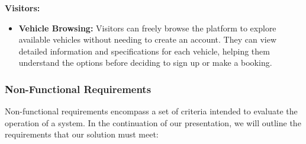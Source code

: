 \noindent\textbf{Visitors:}
\begin{itemize}
    \item \textbf{Vehicle Browsing:} Visitors can freely browse the platform to explore available vehicles without needing to create an account. They can view detailed information and specifications for each vehicle, helping them understand the options before deciding to sign up or make a booking. 
\end{itemize}

\newpage
\subsubsection{Non-Functional Requirements}
Non-functional requirements encompass a set of criteria intended to evaluate the operation of a system. In the continuation of our presentation, we will outline the requirements that our solution must meet:

